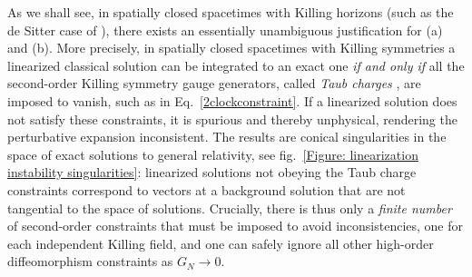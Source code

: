 \documentclass[]{jkpaper}
\theoremstyle{plain}
\theoremstyle{definition}
\begin{document}
As we shall see, in spatially closed spacetimes with Killing horizons (such as the de Sitter case of \cite{Chandrasekaran:2022cip}), there exists an essentially unambiguous justification for (a) and (b). More precisely, in spatially closed spacetimes with Killing symmetries a linearized classical solution can be integrated to an exact one \emph{if and only if} all the second-order Killing symmetry gauge generators, called \emph{Taub charges} \cite{Taub1,taub2011variational,Taub2},  are imposed to vanish, such as in Eq.~\eqref{2clockconstraint}. If a linearized solution does not satisfy these constraints, it is spurious and thereby unphysical, rendering the perturbative expansion inconsistent. The results are conical singularities in the space of exact solutions to general relativity, see fig.~\ref{Figure: linearization instability singularities}: linearized solutions not obeying the Taub charge constraints correspond to vectors at a background solution that are not tangential to the space of solutions. Crucially, there is thus only a \emph{finite number} of second-order constraints that must be imposed to avoid inconsistencies, one for each independent Killing field, and one can safely ignore all other high-order diffeomorphism constraints as $G_N\to0$.
\end{document}
